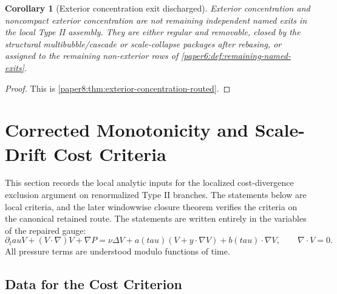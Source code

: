 \documentclass[11pt]{amsart}
\def\tau{tau}%
\theoremstyle{plain}
\newtheorem{corollary}[corollary]{Corollary}
\theoremstyle{definition}
\theoremstyle{remark}
\begin{document}
\begin{corollary}[Exterior concentration exit discharged]
\label{paper8:cor:exterior-concentration-exit-discharged}
Exterior concentration and noncompact exterior concentration are not remaining
independent named exits in the local Type II assembly.  They are either regular
and removable, closed by the structural multibubble/cascade or scale-collapse
packages after rebasing, or assigned to the remaining non-exterior rows of
\cref{paper6:def:remaining-named-exits}.
\end{corollary}

\begin{proof}
This is \cref{paper8:thm:exterior-concentration-routed}.
\end{proof}

\clearpage
\section{Corrected Monotonicity and Scale-Drift Cost Criteria}
\label{sec:corrected-monotonicity-scale-drift}

This section records the local analytic inputs for the localized
cost-divergence exclusion argument on renormalized Type II branches.  The
statements below are local criteria, and the later windowwise closure theorem
verifies the criteria on the canonical retained route.
The statements are written entirely in the variables of the repaired gauge:
\[
  \partial_\tau V+(V\cdot\nabla)V+\nabla P
  =
  \nu\Delta V+a(\tau)(V+y\cdot\nabla V)+b(\tau)\cdot\nabla V,
  \qquad \nabla\cdot V=0.
\]
All pressure terms are understood modulo functions of time.

\subsection{Data for the Cost Criterion}
\end{document}
